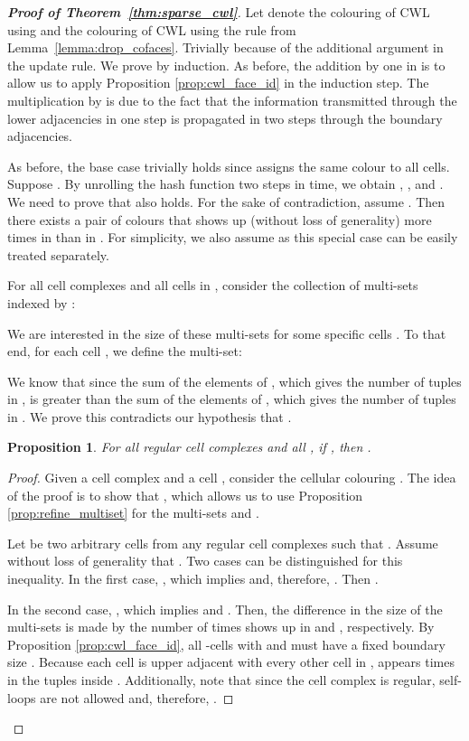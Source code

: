\documentclass{article}
\newtheorem{proposition}[theorem]{Proposition}
\begin{document}
\begin{proof}[\textbf{Proof of Theorem~\ref{thm:sparse_cwl}}]
Let  denote the colouring of CWL using  and  the colouring of CWL using the rule  from  Lemma~\ref{lemma:drop_cofaces}. Trivially  because of the additional argument  in the update rule. We prove  by induction. As before, the addition by one in  is to allow us to apply Proposition \ref{prop:cwl_face_id} in the induction step. The multiplication by  is due to the fact that the information transmitted through the lower adjacencies in one step is propagated in two steps through the boundary adjacencies.  

As before, the base case trivially holds since  assigns the same colour to all cells. Suppose . By unrolling the hash function two steps in time, we obtain , , and . We need to prove that  also holds. For the sake of contradiction, assume . Then there exists a pair of colours  that shows up (without loss of generality) more times in  than in . For simplicity, we also assume  as this special case can be easily treated separately. 

For all cell complexes  and all cells  in , consider the collection of multi-sets  indexed by :

We are interested in the size of these multi-sets for some specific cells . To that end, for each cell , we define the multi-set:

We know that  since the sum of the elements of , which gives the number of tuples  in , is greater than the sum of the elements of , which gives the number of tuples  in . We prove this contradicts our hypothesis that . 

\begin{proposition}
\label{prop:partition_low_adj} 
For all regular cell complexes  and all , if , then . 
\end{proposition}

\begin{proof}
Given a cell complex  and a cell , consider the cellular colouring . The idea of the proof is to show that , which allows us to use Proposition \ref{prop:refine_multiset} for the multi-sets  and . 

Let  be two arbitrary cells from any regular cell complexes  such that . Assume without loss of generality that . Two cases can be distinguished for this inequality. In the first case, , which implies  and, therefore, . Then . 

In the second case, , which implies  and . Then, the difference in the size of the multi-sets is made by the number of times  shows up in  and , respectively. By Proposition \ref{prop:cwl_face_id}, all -cells  with  and  must have a fixed boundary size . Because each cell  is upper adjacent with every other cell in ,  appears  times in the tuples inside . Additionally, note that since the cell complex is regular, self-loops are not allowed and, therefore, . 


\end{proof}
\end{proof}
\end{document}
